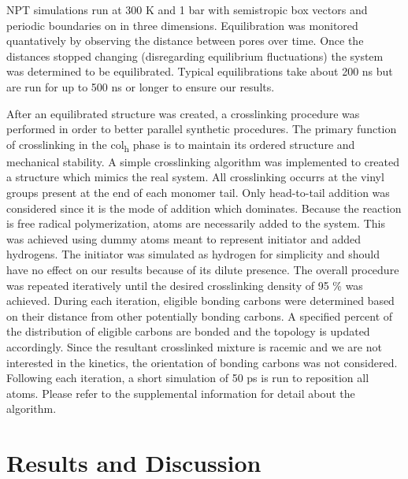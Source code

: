 \documentclass{article}
\begin{document}
	NPT simulations run at 300 K and 1 bar with semistropic box vectors and periodic boundaries on in three dimensions. Equilibration was monitored quantatively by observing the distance between pores over time. Once the distances stopped changing (disregarding equilibrium fluctuations) the system was determined to be equilibrated. Typical equilibrations take about 200 ns but are run for up to 500 ns or longer to ensure our results.
 
	After an equilibrated structure was created, a crosslinking procedure was performed in order to better parallel synthetic procedures. The primary function of crosslinking in the col\textsubscript{h} phase is to maintain its ordered structure and mechanical stability. A simple crosslinking algorithm was implemented to created a structure which mimics the real system. All crosslinking occurrs at the vinyl groups present at the end of each monomer tail. Only head-to-tail addition was considered since it is the mode of addition which dominates. Because the reaction is free radical polymerization, atoms are necessarily added to the system. This was achieved using dummy atoms meant to represent initiator and added hydrogens. The initiator was simulated as hydrogen for simplicity and should have no effect on our results because of its dilute presence. The overall procedure was repeated iteratively until the desired crosslinking density of 95 \% was achieved. During each iteration, eligible bonding carbons were determined based on their distance from other potentially bonding carbons. A specified percent of the distribution of eligible carbons are bonded and the topology is updated accordingly. Since the resultant crosslinked mixture is racemic and we are not interested in the kinetics, the orientation of bonding carbons was not considered. Following each iteration, a short simulation of 50 ps is run to reposition all atoms. Please refer to the supplemental information for detail about the algorithm.     
	
	\section{Results and Discussion}
	
\end{document}
